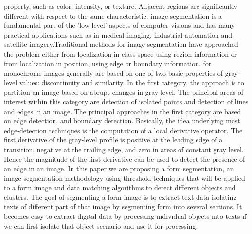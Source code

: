 property, such as color, intensity, or texture. Adjacent regions are significantly different with respect to the same characteristic. 
image segmentation is a fundamental part of the 'low level' aspects of computer visions and has many practical applications such as in medical imaging, industrial automation and satellite imagery.Traditional methods for image segmentation have approached the problem either from localization in class space using region information or from localization in position, using edge or boundary information. for monochrome images generally are based on one of two basic properties of gray- level values: discontinuity and similarity. In the ﬁrst category, the approach is to partition an image based on abrupt changes in gray level. The principal areas of interest within this category are detection of isolated points and detection of lines and edges in an image. The principal approaches in the ﬁrst category are based on edge detection, and boundary detection. Basically, the idea underlying most edge-detection techniques is the computation of a local derivative operator. The ﬁrst derivative of the gray-level proﬁle is positive at the leading edge of a transition, negative at the trailing edge, and zero in areas of constant gray level. Hence the magnitude of the ﬁrst derivative can be used to detect the presence of an edge in an image.
In this paper we are proposing a form segmentation, an image segmentation methodology using threshold techniques that will be applied to a form image and data matching algorithms to detect different objects and clusters.
The goal of segmenting a form image is to extract text data isolating texts of different part of that image by segmenting form into several sections. It becomes easy to extract digital data by processing individual objects into texts if we can first isolate that object scenario and use it for processing.

